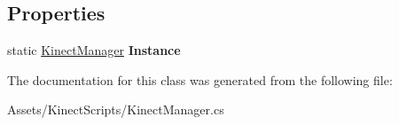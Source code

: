 \subsection*{Properties}
\begin{DoxyCompactItemize}
\item 
\mbox{\label{class_kinect_manager_a9a10cdd70f266d89669ac15c5351c7ac}} 
static \mbox{\hyperlink{class_kinect_manager}{Kinect\+Manager}} {\bfseries Instance}
\end{DoxyCompactItemize}


The documentation for this class was generated from the following file\+:\begin{DoxyCompactItemize}
\item 
Assets/\+Kinect\+Scripts/Kinect\+Manager.\+cs\end{DoxyCompactItemize}
